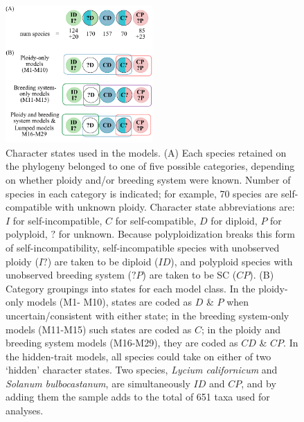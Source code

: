 \begin{figure}
\centering
\includegraphics[width=0.5\textwidth]{fig1.pdf}
\caption{
Character states used in the models.
(A) Each species retained on the phylogeny belonged to one of five possible categories, depending on whether ploidy and/or breeding system were known. 
Number of species in each category is indicated; for example, 70 species are self-compatible with unknown ploidy.
Character state abbreviations are: $I$ for self-incompatible, $C$ for self-compatible, $D$ for diploid, $P$ for polyploid, $?$ for unknown.
Because polyploidization breaks this form of self-incompatibility, self-incompatible species with unobserved ploidy ($I?$) are taken to be diploid ($ID$), and polyploid species with unobserved breeding system ($?P$) are taken to be SC ($CP$).
(B) Category groupings into states for each model class.
In the ploidy-only models (M1- M10), states are coded as $D$ \& $P$ when uncertain/consistent with either state; in the breeding system-only models (M11-M15) such states are coded as $C$; in the ploidy and breeding system models (M16-M29), they are coded as $CD$ \& $CP$.
In the hidden-trait models, all species could take on either of two `hidden' character states. %
Two species, \emph{Lycium californicum} and \emph{Solanum bulbocastanum}, are simultaneously $ID$ and $CP$, and by adding them the sample adds to the total of 651 taxa used for analyses.
}\label{figure:stateclassifications}
\end{figure}

